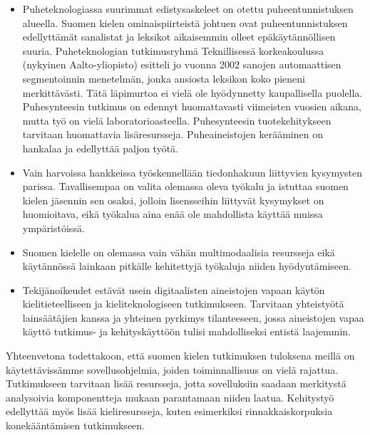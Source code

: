 \documentclass{../../metanetpaper}
\begin{document}
\begin{Parallel}[c]{79mm}{78mm}
{\begin{itemize}
\item Puheteknologiassa suurimmat edistysaskeleet on otettu
    puheentunnistuksen alueella. Suomen kielen ominaispiirteistä
    johtuen ovat puheentunnistuksen edellyttämät sanalistat ja
    leksikot aikaisemmin olleet epäkäytännöllisen suuria.
    Puheteknologian tutkimusryhmä Teknillisessä korkeakoulussa
    (nykyinen Aalto-yliopisto) esitteli jo vuonna 2002 sanojen
    automaattisen segmentoinnin menetelmän, jonka ansiosta leksikon
    koko pieneni merkittävästi. Tätä läpimurtoa ei vielä ole
    hyödynnetty kaupallisella puolella. Puhesynteesin tutkimus on
    edennyt huomattavasti viimeisten vuosien aikana, mutta työ on
    vielä laboratorioasteella. Puhesynteesin tuotekehitykseen
    tarvitaan huomattavia lisäresursseja. Puheaineistojen kerääminen
    on hankalaa ja edellyttää paljon työtä.

\item Vain harvoissa hankkeissa työskennellään tiedonhakuun liittyvien
    kysymysten parissa. Tavallisempaa on valita olemassa oleva työkalu
    ja istuttaa suomen kielen jäsennin sen osaksi, jolloin
    lisensseihin liittyvät kysymykset on huomioitava, eikä työkalua
    aina enää ole mahdollista käyttää muissa ympäristöissä.

\item Suomen kielelle on olemassa vain vähän multimodaalisia
    resursseja eikä käytännössä lainkaan pitkälle kehitettyjä
    työkaluja niiden hyödyntämiseen.

\item Tekijänoikeudet estävät usein digitaalisten aineistojen vapaan
    käytön kielitieteelliseen ja kieliteknologiseen
    tutkimukseen. Tarvitaan yhteistyötä lainsäätäjien kanssa ja
    yhteinen pyrkimys tilanteeseen, jossa aineistojen vapaa käyttö
    tutkimus- ja kehityskäyttöön tulisi mahdolliseksi entistä
    laajemmin.
\end{itemize}
Yhteenvetona todettakoon, että suomen kielen tutkimuksen tuloksena
meillä on käytettävissämme sovellusohjelmia, joiden toiminnallisuus on
vielä rajattua.  Tutkimukseen tarvitaan lisää resursseja, jotta
sovelluksiin saadaan merkitystä analysoivia komponentteja mukaan
parantamaan niiden laatua. Kehitystyö edellyttää myös lisää
kieliresursseja, kuten esimerkiksi rinnakkaiskorpuksia konekääntämisen
tutkimukseen.
}

\end{Parallel}
\end{document}
